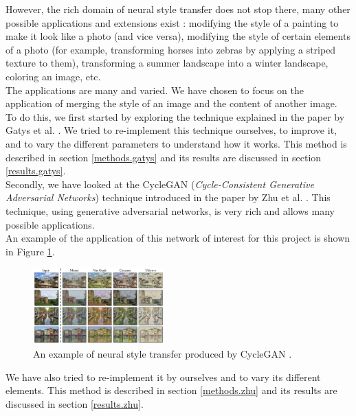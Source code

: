 \documentclass[twocolumn,superscriptaddress,aps, floatfix]{revtex4-1}
\begin{document}
    However, the rich domain of neural style transfer does not stop there, many other possible applications and extensions exist : modifying the style of a painting to make it look like a photo (and vice versa), modifying the style of certain elements of a photo (for example, transforming horses into zebras by applying a striped texture to them), transforming a summer landscape into a winter landscape, coloring an image, etc.\\
    
    The applications are many and varied. We have chosen to focus on the application of merging the style of an image and the content of another image.\\
    
    To do this, we first started by exploring the technique explained in the paper by Gatys et al. \cite{DBLP:journals/corr/GatysEB15a}. We tried to re-implement this technique ourselves, to improve it, and to vary the different parameters to understand how it works. This method is described in section \ref{methods.gatys} and its results are discussed in section \ref{results.gatys}.\\
    
    Secondly, we have looked at the CycleGAN (\emph{Cycle-Consistent Generative Adversarial Networks}) technique introduced in the paper by Zhu et al. \cite{DBLP:journals/corr/ZhuPIE17}. This technique, using generative adversarial networks, is very rich and allows many possible applications.\\
    
    An example of the application of this network of interest for this project is shown in Figure \ref{fig:introduction.example.cyclegan}.
    
    \begin{figure}[ht]
        \centering
        \includegraphics[width=0.45\textwidth]{resources/png/cyclegan-example.png}
        \caption{An example of neural style transfer produced by CycleGAN \cite{junyanz.github.io}.}
        \label{fig:introduction.example.cyclegan}
    \end{figure}
    
    We have also tried to re-implement it by ourselves and to vary its different elements. This method is described in section \ref{methods.zhu} and its results are discussed in section \ref{results.zhu}.\\
    
\end{document}
